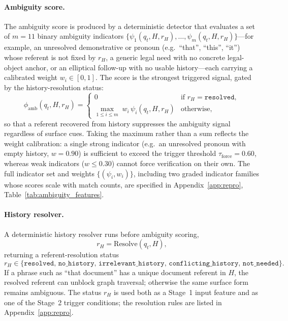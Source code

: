 \documentclass[pdflatex,sn-mathphys-num]{sn-jnl}
\begin{document}
\paragraph{Ambiguity score.}
The ambiguity score is produced by a deterministic detector that evaluates a
set of $m=11$ binary ambiguity indicators
$\{\psi_1(q_t,H,r_H),\ldots,\psi_m(q_t,H,r_H)\}$---for example, an
unresolved demonstrative or pronoun (e.g.\ ``that'', ``this'', ``it'')
whose referent is not fixed by $r_H$, a generic legal need with no concrete
legal-object anchor, or an elliptical follow-up with no usable history---each
carrying a calibrated weight $w_i\in[0,1]$. The score is the strongest
triggered signal, gated by the history-resolution status:
\begin{equation}
\phi_{\mathrm{amb}}(q_t,H,r_H)=
\begin{cases}
0 & \text{if } r_H=\texttt{resolved},\\[3pt]
\displaystyle\max_{1\le i\le m}\; w_i\,\psi_i(q_t,H,r_H) & \text{otherwise},
\end{cases}
\label{eq:ambiguity_score}
\end{equation}
so that a referent recovered from history suppresses the ambiguity signal
regardless of surface cues. Taking the maximum rather than a sum reflects the
weight calibration: a single strong indicator (e.g.\ an unresolved pronoun
with empty history, $w=0.90$) is sufficient to exceed the trigger threshold
$\tau_{\mathrm{force}}=0.60$, whereas weak indicators ($w\le 0.30$) cannot
force verification on their own. The full indicator set and weights
$\{(\psi_i,w_i)\}$, including two graded indicator families whose scores
scale with match counts, are specified in Appendix~\ref{app:repro},
Table~\ref{tab:ambiguity_features}.

\paragraph{History resolver.}
A deterministic history resolver runs before ambiguity scoring,
\begin{equation}
r_H = \mathrm{Resolve}(q_t,H),
\label{eq:history_resolver}
\end{equation}
returning a referent-resolution status
\begin{equation}
r_H\in\{\texttt{resolved},\,\texttt{no\_history},\,\texttt{irrelevant\_history},\,\texttt{conflicting\_history},\,\texttt{not\_needed}\}.
\label{eq:history_states}
\end{equation}
If a phrase such as ``that document'' has a unique document referent in
$H$, the resolved referent can unblock graph traversal; otherwise the same
surface form remains ambiguous. The status $r_H$ is used both as a Stage~1
input feature and as one of the Stage~2 trigger conditions; the resolution
rules are listed in Appendix~\ref{app:repro}.
\end{document}

